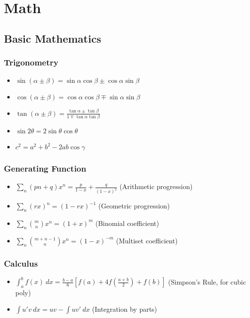 \documentclass[landscape, 8pt, a4paper, oneside, twocolumn]{extarticle}
\begin{document}
\section{Math}

\subsection{Basic Mathematics}

\subsubsection{Trigonometry}
\begin{itemize}
\item $ \sin(\alpha \pm \beta) = \sin\alpha \cos\beta \pm \cos\alpha \sin\beta $
\item $ \cos(\alpha \pm \beta) = \cos\alpha \cos\beta \mp \sin\alpha \sin\beta $
\item $ \tan(\alpha \pm \beta) = \frac{\tan\alpha \pm \tan\beta}{1 \mp \tan\alpha \tan\beta}$
\item $ \sin 2\theta = 2\sin\theta\cos\theta $
\item $ c^2 = a^2 + b^2 - 2ab\cos\gamma$
\end{itemize}
\subsubsection{Generating Function}
\begin{itemize}
    \item $ \sum_{n} (pn + q)x^n = \frac{p}{1-x} + \frac{q}{(1-x)^2}$ (Arithmetic progression)
    \item $ \sum_{n} (rx)^n = (1 - rx)^{-1}$ (Geometric progression)
    \item $ \sum_{n} \binom{m}{n} x^n = (1+x)^m$ (Binomial coefficient)
    \item $ \sum_{n} \binom{m+n-1}{n} x^n = (1-x)^{-m}$ (Multiset coefficient)
\end{itemize}
\subsubsection{Calculus}
\begin{itemize}
    \item $\int_{a}^{b} f(x)\ dx = \frac{b-a}{6}\left[f(a) + 4f(\frac{a+b}{2}) + f(b)\right]$ (Simpson's Rule, for cubic poly)
    \item $\int u'v\ dx = uv - \int uv'\ dx$ (Integration by parts)
\end{itemize}
\end{document}
